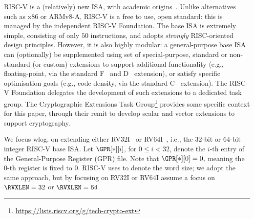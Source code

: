 
RISC-V is a (relatively) new ISA, with academic origins~\cite{riscv:2}.
Unlike alternatives such as x86 or ARMv8-A, RISC-V is a free to use, 
open standard: this is managed by the independent RISC-V Foundation.
The base ISA is extremely simple, consisting of only $50$ instructions,
and adopts {\em strongly} RISC-oriented design principles.  However, it
is also highly modular: a general-purpose base ISA can (optionally) be
supplemented using set of special-purpose, standard or non-standard (or
custom) extensions to
support additional functionality 
(e.g., floating-point, 
       via the 
       standard F~\cite[Section 11]{RV:ISA:I:19}
                and
                D~\cite[Section 12]{RV:ISA:I:19}
       extension),
or 
satisfy specific optimisation goals
(e.g., code density, 
       via the 
       standard C~\cite[Section 16]{RV:ISA:I:19}
       extension).
The RISC-V Foundation delegates the development of such extensions to a
dedicated task group.  The Cryptographic Extensions Task Group\footnote{
  \url{https://lists.riscv.org/g/tech-crypto-ext}
} provides some specific context for this paper, through their remit to 
develop scalar and vector extensions to support cryptography.

We focus wlog. on extending either
RV32I~\cite[Section 2]{RV:ISA:I:19}
or
RV64I~\cite[Section 5]{RV:ISA:I:19},
i.e., the
$32$-bit 
or
$64$-bit 
integer RISC-V base ISA.
Let $\GPR[*][ i ]$, for $0 \leq i < 32$, denote the $i$-th entry of the 
General-Purpose Register (GPR) file.  Note that 
$
\GPR[*][ 0 ] = 0 ,
$
meaning the $0$-th register is fixed to $0$.
RISC-V uses \RVXLEN to denote the word size; we adopt the same approach, 
but by focusing on 
RV32I 
or
RV64I 
assume a focus on 
$\RVXLEN = 32$
or
$\RVXLEN = 64$.

